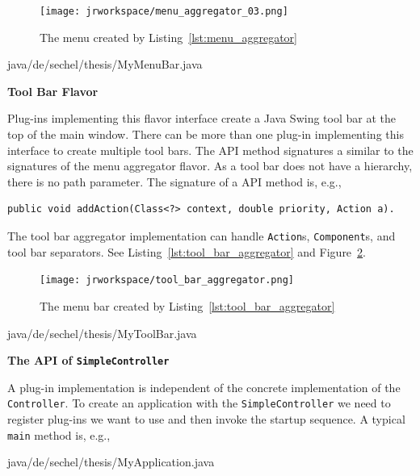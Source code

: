 \begin{figure}[H]
\centering
\texttt{[image: jrworkspace/menu\_aggregator\_03.png]}
\caption{The menu created by Listing~\ref{lst:menu_aggregator}}
\label{fig:menu_aggregator}
\end{figure}

 {java/de/sechel/thesis/MyMenuBar.java}

{\bf Tool Bar Flavor}

Plug-ins implementing this flavor interface create a {\sc Java Swing\TReg} tool bar at the top of the 
main window. There can be more than one plug-in implementing this interface to create multiple 
tool bars. The API method signatures a similar to the signatures of the menu aggregator flavor. As 
a tool bar does not have a hierarchy, there is no path parameter. The signature of a API method is, e.g.,

\begin{lstlisting}[numbers=none]
	public void addAction(Class<?> context, double priority, Action a).
\end{lstlisting}

The tool bar aggregator implementation can handle {\tt Action}s, {\tt Component}s, and tool bar
separators. See Listing~\ref{lst:tool_bar_aggregator} and Figure~\ref{fig:tool_bar_aggregator}.

\begin{figure}[H]
\centering
\texttt{[image: jrworkspace/tool\_bar\_aggregator.png]}
\caption{The menu bar created by Listing~\ref{lst:tool_bar_aggregator}}
\label{fig:tool_bar_aggregator}
\end{figure}

 {java/de/sechel/thesis/MyToolBar.java}

{\bf The API of {\tt SimpleController}}

A plug-in implementation is independent of the concrete implementation of the {\tt Controller}. To create an
application with the {\tt SimpleController} we need to register plug-ins we want to use and then invoke the
startup sequence. A typical {\tt main} method is, e.g.,

 {java/de/sechel/thesis/MyApplication.java}


